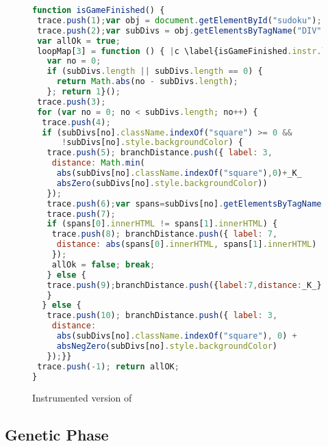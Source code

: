 \begin{figure}[!t]
  \tiny
  \begin{lstlisting}[style=htmlcssjs,language=JavaScript,basicstyle={\tiny\ttfamily}]
function isGameFinished() {
 trace.push(1);var obj = document.getElementById("sudoku"); |c \label{isGameFinished.instr.trace} |c
 trace.push(2);var subDivs = obj.getElementsByTagName("DIV");
 var allOk = true;
 loopMap[3] = function () { |c \label{isGameFinished.instr.loopMap} |c
   var no = 0;
   if (subDivs.length || subDivs.length == 0) {
     return Math.abs(no - subDivs.length);
   }; return 1}();
 trace.push(3);
 for (var no = 0; no < subDivs.length; no++) {
  trace.push(4);
  if (subDivs[no].className.indexOf("square") >= 0 &&
      !subDivs[no].style.backgroundColor) {
   trace.push(5); branchDistance.push({ label: 3,
    distance: Math.min(
     abs(subDivs[no].className.indexOf("square"),0)+_K_
     absZero(subDivs[no].style.backgroundColor))
   });
   trace.push(6);var spans=subDivs[no].getElementsByTagName("SPAN");
   trace.push(7);
   if (spans[0].innerHTML != spans[1].innerHTML) {
    trace.push(8); branchDistance.push({ label: 7,
     distance: abs(spans[0].innerHTML, spans[1].innerHTML)
    });
    allOk = false; break;
   } else {
   trace.push(9);branchDistance.push({label:7,distance:_K_});
   }
  } else {
   trace.push(10); branchDistance.push({ label: 3,
    distance:
     abs(subDivs[no].className.indexOf("square"), 0) +
     absNegZero(subDivs[no].style.backgroundColor)
   });}}
 trace.push(-1); return allOK;
}
\end{lstlisting}
  \caption{Instrumented version of  }
  \label{code.isGameFinished.instr}
\end{figure}

\subsection{Genetic Phase}
\label{sub.sec.genetic.phase}

